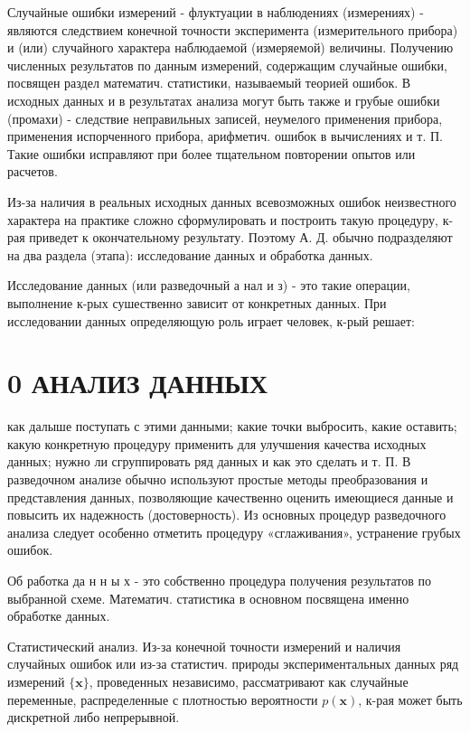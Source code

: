 \documentclass[10pt]{article}
\begin{document}
Случайные ошибки измерений - флуктуации в наблюдениях (измерениях) - являются следствием конечной точности эксперимента (измерительного прибора) и (или) случайного характера наблюдаемой (измеряемой) величины. Получению численных результатов по данным измерений, содержащим случайные ошибки, посвящен раздел математич. статистики, называемый теорией ошибок. В исходных данных и в результатах анализа могут быть также и грубые ошибки (промахи) - следствие неправильных записей, неумелого применения прибора, применения испорченного прибора, арифметич. ошибок в вычислениях и т. П. Такие ошибки исправляют при более тщательном повторении опытов или расчетов.



Из-за наличия в реальных исходных данных всевозможных ошибок неизвестного характера на практике сложно сформулировать и построить такую процедуру, к-рая приведет к окончательному результату. Поэтому А. Д. обычно подразделяют на два раздела (этапа): исследование данных и обработка данных.



Исследование данных (или разведочный а нал и з) - это такие операции, выполнение к-рых сушественно зависит от конкретных данных. При исследовании данных определяющую роль играет человек, к-рый решает:



\section{0 АНАЛИЗ ДАННЫХ}

как далыше поступать с этими данными; какие точки выбросить, какие оставить; какую конкретную процедуру применить для улучшения качества исходных данных; нужно ли сгруппировать ряд данных и как это сделать и т. П. В разведочном анализе обычно используют простые методы преобразования и представления данных, позволяющие качественно оценить имеющиеся данные и повысить их надежность (достоверность). Из основных процедур разведочного анализа следует особенно отметить процедуру «сглаживания», устранение грубых ошибок.



Об работка да н н ы х - это собственно процедура получения результатов по выбранной схеме. Математич. статистика в основном посвящена именно обработке данных.



Статистический анализ. Из-за конечной точности измерений и наличия случайных ошибок или из-за статистич. природы экспериментальных данных ряд измерений $\{\boldsymbol{x}\}$, проведенных независимо, рассматривают как случайные переменные, распределенные с плотностью вероятности $p(\boldsymbol{x})$, к-рая может быть дискретной либо непрерывной.
\end{document}
